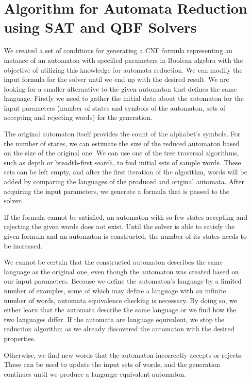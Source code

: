 \section{Algorithm for Automata Reduction using SAT and QBF Solvers}
\label{sec:sat_qbf_alg}
We created a set of conditions for generating a CNF formula representing an instance of an automaton with specified parameters in Boolean algebra with the objective of utilizing this knowledge for automata reduction. We can modify the input formula for the solver until we end up with the desired result. We are looking for a smaller alternative to the given automaton that defines the same language. Firstly we need to gather the initial data about the automaton for the input parameters (number of states and symbols of the automaton, sets of accepting and rejecting words) for the generation.

The original automaton itself provides the count of the alphabet's symbols. For the number of states, we can estimate the size of the reduced automaton based on the size of the original one. We can use one of the tree traversal algorithms, such as depth or breadth-first search, to find initial sets of sample words. These sets can be left empty, and after the first iteration of the algorithm, words will be added by comparing the languages of the produced and original automata. After acquiring the input parameters, we generate a formula that is passed to the solver.

If the formula cannot be satisfied, an automaton with so few states accepting and rejecting the given words does not exist. Until the solver is able to satisfy the given formula and an automaton is constructed, the number of its states needs to be increased.

We cannot be certain that the constructed automaton describes the same language as the original one, even though the automaton was created based on our input parameters. Because we define the automaton's language by a limited number of examples, some of which may define a language with an infinite number of words, automata equivalence checking is necessary. By doing so, we either learn that the automata describe the same language or we find how the two languages differ. If the automata are language equivalent, we stop the reduction algorithm as we already discovered the automaton with the desired properties.

Otherwise, we find new words that the automaton incorrectly accepts or rejects. These can be used to update the input sets of words, and the generation continues until we produce a language-equivalent automaton. 

